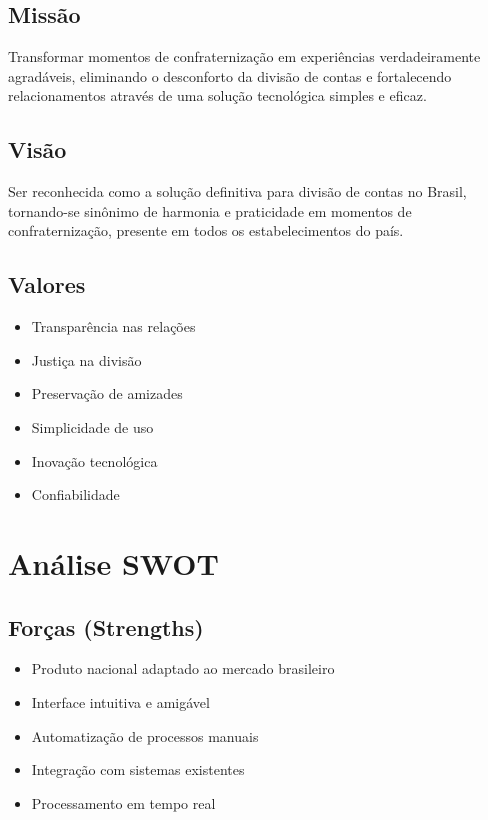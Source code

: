 \documentclass[12pt,a4paper]{article}
\begin{document}
\subsection{Missão}
Transformar momentos de confraternização em experiências verdadeiramente agradáveis, eliminando o desconforto da divisão de contas e fortalecendo relacionamentos através de uma solução tecnológica simples e eficaz.

\subsection{Visão}
Ser reconhecida como a solução definitiva para divisão de contas no Brasil, tornando-se sinônimo de harmonia e praticidade em momentos de confraternização, presente em todos os estabelecimentos do país.

\subsection{Valores}
\begin{itemize}
    \item Transparência nas relações
    \item Justiça na divisão
    \item Preservação de amizades
    \item Simplicidade de uso
    \item Inovação tecnológica
    \item Confiabilidade
\end{itemize}

\section{Análise SWOT}

\subsection{Forças (Strengths)}
\begin{itemize}
    \item Produto nacional adaptado ao mercado brasileiro
    \item Interface intuitiva e amigável
    \item Automatização de processos manuais
    \item Integração com sistemas existentes
    \item Processamento em tempo real
\end{itemize}
\end{document}

